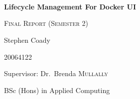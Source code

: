 \begin{titlepage}
	\mbox{}\\
	\mbox{}\\
	\mbox{}\\
	{\huge\bfseries Lifecycle Management For Docker UI\par}
	\vspace{1cm}
	{\scshape\large Final Report (Semester 2)\par}
	\vspace{3cm}
	{\Large Stephen Coady\par}
	\vspace{1cm}
	{\Large 20064122\par}
	\vspace{3cm}\par
	\vfill
	{\Large Supervisor: Dr.~Brenda \textsc{Mullally}}
	\vspace{1cm}\par
	{\Large BSc (Hons) in Applied Computing\par}


	\vfill
	
\end{titlepage}
